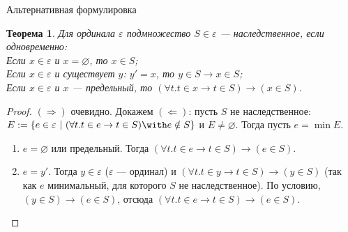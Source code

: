 \documentclass[handout]{beamer}
\newtheorem{thm}{Теорема}[section]
\begin{document}
\begin{frame}{Альтернативная формулировка}
\begin{thm}Для ординала $\varepsilon$ подмножество $S \in \varepsilon$ --- наследственное, %
если одновременно:\\
Если $x \in \varepsilon$ и $x = \varnothing$, то $x \in S$;\\
Если $x \in \varepsilon$ и существует $y$: $y' = x$, то $y \in S \rightarrow x \in S$;\\
Если $x \in \varepsilon$ и $x$ --- предельный, то $(\forall t.t \in x \rightarrow t \in S) \rightarrow (x \in S)$.
\end{thm}

\begin{proof}$(\Rightarrow)$ очевидно. \pause Докажем $(\Leftarrow)$: пусть $S$ не наследственное: 
$E := \{e \in \varepsilon \ |\  (\forall t.t \in e \rightarrow t \in S) \with e \notin S \}$
и $E \ne \varnothing$. Тогда пусть $e = \min E$. %

\begin{enumerate}
\item $e = \varnothing$ или предельный. Тогда $(\forall t.t \in e \rightarrow t \in S) \rightarrow (e \in S)$.
\item $e = y'$. Тогда $y \in \varepsilon$ ($\varepsilon$ --- ординал) и 
$(\forall t.t \in y \rightarrow t \in S) \rightarrow (y \in S)$ (так как $e$ минимальный, для которого $S$ не наследственное). \pause
По условию, $(y \in S) \rightarrow (e \in S)$, отсюда $(\forall t.t \in e \rightarrow t \in S) \rightarrow (e \in S)$.

\begin{center}\end{center}

\end{enumerate}\vspace{-0.3cm}
\end{proof}

\end{frame}
\end{document}
